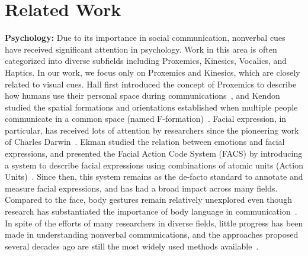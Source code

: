 







\section{Related Work}

\textbf{Psychology:}
Due to its importance in social communication, nonverbal cues have received significant attention in psychology. Work in this area is often categorized into diverse subfields including Proxemics, Kinesics, Vocalics, and Haptics. In our work, we focus only on Proxemics and Kinesics, which are closely related to visual cues. Hall first introduced the concept of Proxemics to describe how humans use their personal space during communications~\cite{Hall66}, and Kendon studied the spatial formations and orientations established when multiple people communicate in a common space (named F-formation)~\cite{kendon90}. Facial expression, in particular, has received lots of attention by researchers since the pioneering work of Charles Darwin~\cite{Darwin-1872}. Ekman studied the relation between emotions and facial expressions, and presented the  Facial Action Code System (FACS) by introducing a system to describe facial expressions using combinations of atomic units (Action Units)~\cite{ekman1977facial}. Since then, this system remains as the de-facto standard to annotate and measure facial expressions, and has had a broad impact across many fields. Compared to the face, body gestures remain relatively unexplored even though research has substantiated the importance of body language in communication~\cite{Gelder09, Moore13, Meeren-2005, Aviezer-2012}. In spite of the efforts of many researchers in diverse fields, little progress has been made in understanding nonverbal communications, and the approaches proposed several decades ago are still the most widely used methods available~\cite{Moore13}.


